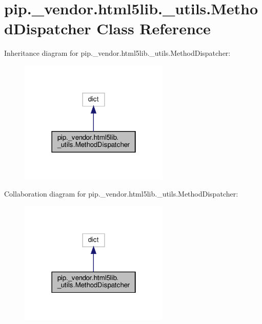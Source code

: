\hypertarget{classpip_1_1__vendor_1_1html5lib_1_1__utils_1_1MethodDispatcher}{}\section{pip.\+\_\+vendor.\+html5lib.\+\_\+utils.\+Method\+Dispatcher Class Reference}
\label{classpip_1_1__vendor_1_1html5lib_1_1__utils_1_1MethodDispatcher}


Inheritance diagram for pip.\+\_\+vendor.\+html5lib.\+\_\+utils.\+Method\+Dispatcher\+:
\nopagebreak
\begin{figure}[H]
\begin{center}
\leavevmode
\includegraphics[width=202pt]{classpip_1_1__vendor_1_1html5lib_1_1__utils_1_1MethodDispatcher__inherit__graph}
\end{center}
\end{figure}


Collaboration diagram for pip.\+\_\+vendor.\+html5lib.\+\_\+utils.\+Method\+Dispatcher\+:
\nopagebreak
\begin{figure}[H]
\begin{center}
\leavevmode
\includegraphics[width=202pt]{classpip_1_1__vendor_1_1html5lib_1_1__utils_1_1MethodDispatcher__coll__graph}
\end{center}
\end{figure}
